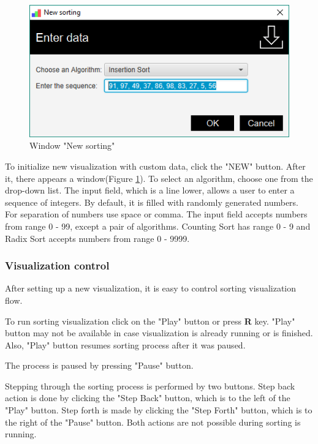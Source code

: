 \documentclass[
  field=inf,
  biblatex,
  language=english,
  glossaries,
  theorems=false,
  sourcecodes=false,
  index
]{kidiplom}
\begin{document}
\begin{figure}[H]
\begin{center}
	\includegraphics[scale=0.5]{img/ui/WindowNew.png}
	\caption{Window "New sorting"}\label{fig:new}
\end{center}
\end{figure}

To initialize new visualization with custom data, click the "NEW" button. After it, there appears a window(Figure \ref{fig:new}). To select an algorithm, choose one from the drop-down list. The input field, which is a line lower, allows a user to enter a sequence of integers. By default, it is filled with randomly generated numbers. For separation of numbers use space or comma. The input field accepts numbers from range 0 - 99, except a pair of algorithms. Counting Sort has range 0 - 9 and Radix Sort accepts numbers from range 0 - 9999. 

\subsubsection{Visualization control}

After setting up a new visualization, it is easy to control sorting visualization flow.

To run sorting visualization click on the "Play" button or press \textbf{R} key. "Play" button may not be available in case visualization is already running or is finished. Also, "Play" button resumes sorting process after it was paused.

The process is paused by pressing "Pause" button.

Stepping through the sorting process is performed by two buttons. Step back action is done by clicking the "Step Back" button, which is to the left of the "Play" button. Step forth is made by clicking the "Step Forth" button, which is to the right of the "Pause" button. Both actions are not possible during sorting is running.
\end{document}
